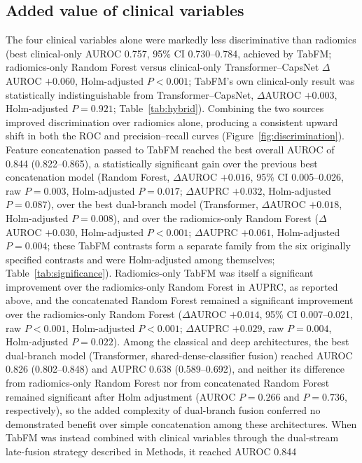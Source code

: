 \documentclass[11pt]{article}
\begin{document}
\subsection{Added value of clinical variables}
\label{sec:res-clinical}

The four clinical variables alone were markedly less discriminative than
radiomics (best clinical-only AUROC 0.757, 95\% CI 0.730--0.784, achieved by
TabFM; radiomics-only Random Forest versus clinical-only Transformer--CapsNet
$\Delta$AUROC $+0.060$, Holm-adjusted $P<0.001$; TabFM's own clinical-only
result was statistically indistinguishable from Transformer--CapsNet,
$\Delta$AUROC $+0.003$, Holm-adjusted $P=0.921$; Table~\ref{tab:hybrid}).
Combining the two sources improved discrimination over radiomics alone,
producing a consistent upward shift in both the ROC and precision--recall
curves (Figure~\ref{fig:discrimination}). Feature concatenation passed to TabFM
reached the best overall AUROC of 0.844 (0.822--0.865), a statistically
significant gain over the previous best concatenation model (Random Forest,
$\Delta$AUROC $+0.016$, 95\% CI 0.005--0.026, raw $P=0.003$, Holm-adjusted
$P=0.017$; $\Delta$AUPRC $+0.032$, Holm-adjusted $P=0.087$), over the best
dual-branch model (Transformer, $\Delta$AUROC $+0.018$, Holm-adjusted
$P=0.008$), and over the radiomics-only Random Forest ($\Delta$AUROC $+0.030$,
Holm-adjusted $P<0.001$; $\Delta$AUPRC $+0.061$, Holm-adjusted $P=0.004$; these
TabFM contrasts form a separate family from the six originally specified
contrasts and were Holm-adjusted among themselves; Table~\ref{tab:significance}).
Radiomics-only TabFM was itself a significant improvement over the
radiomics-only Random Forest in AUPRC, as reported above, and the concatenated
Random Forest remained a significant improvement over the radiomics-only Random
Forest ($\Delta$AUROC $+0.014$, 95\% CI 0.007--0.021, raw $P<0.001$,
Holm-adjusted $P<0.001$; $\Delta$AUPRC $+0.029$, raw $P=0.004$, Holm-adjusted
$P=0.022$). Among the classical and deep architectures, the best dual-branch
model (Transformer, shared-dense-classifier fusion) reached AUROC 0.826
(0.802--0.848) and AUPRC 0.638 (0.589--0.692), and neither its difference from
radiomics-only Random Forest nor from concatenated Random Forest remained
significant after Holm adjustment (AUROC $P=0.266$ and $P=0.736$,
respectively), so the added complexity of dual-branch fusion conferred no
demonstrated benefit over simple concatenation among these architectures. When
TabFM was instead combined with clinical variables through the dual-stream
late-fusion strategy described in Methods, it reached AUROC 0.844
\end{document}
